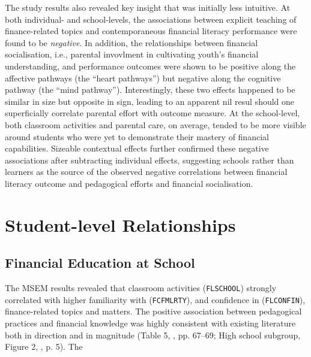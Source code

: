 \documentclass[a4paper,11pt,UKenglish,twoside,openright]{report}\usepackage[]{graphicx}\usepackage[]{color}
\begin{document}
The study results also revealed key insight that was initially less intuitive. At both individual- and school-levels, the associations between explicit teaching of finance-related topics and contemporaneous financial literacy performance were found to be \emph{negative}. In addition, the relationships between financial socialisation, i.e., parental invovlment in cultivating youth's financial understanding, and performance outcomes were shown to be positive along the affective pathways (the ``heart pathways'') but negative along the cognitive pathway (the ``mind pathway''). Interestingly, these two effects happened to be similar in size but opposite in sign, leading to an apparent nil resul should one superficially correlate parental effort with outcome measure. At the school-level, both classroom activities and parental care, on average, tended to be more visible around students who were yet to demonstrate their mastery of financial capabilities. Sizeable contextual effects further confirmed these negative associations after subtracting individual effects, suggesting schools rather than learners as the source of the observed negative correlations between financial literacy outcome and pedagogical efforts and financial socialisation.

\section{Student-level Relationships}

\subsection{Financial Education at School}

The MSEM results revealed that classroom activities (\texttt{FLSCHOOL}) strongly correlated with higher familiarity with (\texttt{FCFMLRTY}), and confidence in (\texttt{FLCONFIN}), finance-related topics and matters. The positive association between pedagogical practices and financial knowledge was highly consistent with existing literature both in direction and in magnitude (Table 5, \textcite{amagir:2018}, pp. 67--69; High school subgroup, Figure 2, \textcite{kaiser:2020}, p. 5). The 
\end{document}
